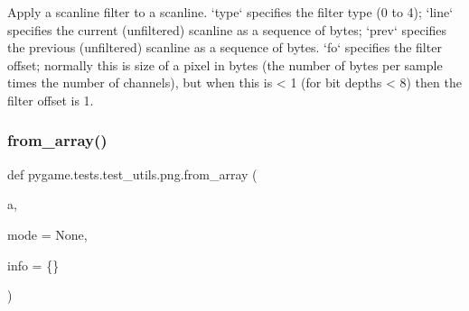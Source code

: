 \begin{DoxyVerb}Apply a scanline filter to a scanline.  `type` specifies the
filter type (0 to 4); `line` specifies the current (unfiltered)
scanline as a sequence of bytes; `prev` specifies the previous
(unfiltered) scanline as a sequence of bytes. `fo` specifies the
filter offset; normally this is size of a pixel in bytes (the number
of bytes per sample times the number of channels), but when this is
< 1 (for bit depths < 8) then the filter offset is 1.
\end{DoxyVerb}
 \mbox{\label{namespacepygame_1_1tests_1_1test__utils_1_1png_a418565b84a8b6f5e9b805640799d9b7d}} 
\subsubsection{\texorpdfstring{from\+\_\+array()}{from\_array()}}
{\footnotesize\ttfamily def pygame.\+tests.\+test\+\_\+utils.\+png.\+from\+\_\+array (\begin{DoxyParamCaption}\item[{}]{a,  }\item[{}]{mode = {\ttfamily None},  }\item[{}]{info = {\ttfamily \{\}} }\end{DoxyParamCaption})}

